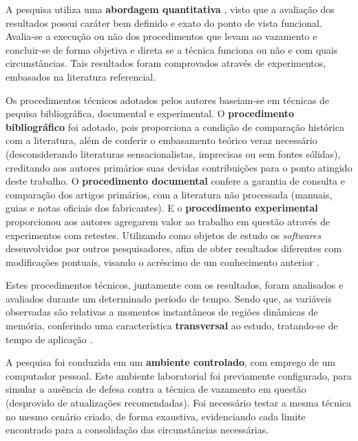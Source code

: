 \documentclass[
	article,			    %
	12pt,				    %
	oneside,			    %
	a4paper,			    %
	chapter=TITLE,		    %
	section=TITLE,		    %
	subsection=TITLE,	    %
	english,			    %
	brazil,				    %
	sumario=tradicional
]{abntex2}
\begin{document}
A pesquisa utiliza uma \textbf{abordagem quantitativa} \cite{Rocha2016Dom}, visto que a avaliação dos resultados possui caráter bem definido e exato do ponto de vista funcional. Avalia-se a execução ou não dos procedimentos que levam ao vazamento e concluir-se de forma objetiva e direta se a técnica funciona ou não e com quais circunstâncias. Tais resultados foram comprovados através de experimentos, embasados na literatura referencial.

Os procedimentos técnicos adotados pelos autores baseiam-se em técnicas de pequisa bibliográfica, documental e experimental. O \textbf{procedimento bibliográfico} foi adotado, pois proporciona a condição de comparação histórica com a literatura, além de conferir o embasamento teórico veraz necessário (desconsiderando literaturas sensacionalistas, imprecisas ou sem fontes sólidas), creditando aos autores primários suas devidas contribuições para o ponto atingido deste trabalho. O \textbf{procedimento documental} confere a garantia de consulta e comparação dos artigos primários, com a literatura não processada (manuais, guias e notas oficiais dos fabricantes). E o \textbf{procedimento experimental} proporcionou aos autores agregarem valor ao trabalho em questão através de experimentos com retestes. Utilizando como objetos de estudo os \emph{softwares} desenvolvidos por outros pesquisadores, afim de obter resultados diferentes com modificações pontuais, visando o acréscimo de um conhecimento anterior \cite{Praca2015Metodologia}.

Estes procedimentos técnicos, juntamente com os resultados, foram analisados e avaliados durante um determinado período de tempo. Sendo que, as variáveis observadas são relativas a momentos instantâneos de regiões dinâmicas de memória, conferindo uma característica \textbf{transversal} ao estudo, tratando-se de tempo de aplicação \cite{Setia2016Methodology}.

A pesquisa foi conduzida em um \textbf{ambiente controlado}, com emprego de um computador pessoal. Este ambiente laboratorial foi previamente configurado, para simular a ausência de defesa contra a técnica de vazamento em questão (desprovido de atualizações recomendadas). Foi necessário testar a mesma técnica no mesmo cenário criado, de forma exaustiva, evidenciando cada limite encontrado para a consolidação das circunstâncias necessárias.

\end{document}
